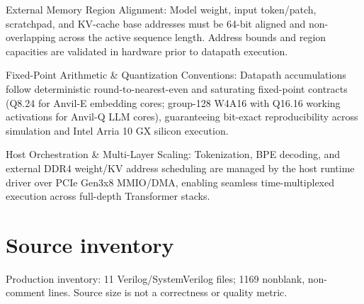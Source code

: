 \documentclass[11pt,a4paper]{article}
\begin{document}
External Memory Region Alignment: Model weight,\allowbreak{} input token/\allowbreak{}patch,\allowbreak{} scratchpad,\allowbreak{} and KV-cache base addresses must be 64-bit aligned and non-overlapping across the active sequence length. Address bounds and region capacities are validated in hardware prior to datapath execution.


Fixed-Point Arithmetic \& Quantization Conventions: Datapath accumulations follow deterministic round-to-nearest-even and saturating fixed-point contracts (\allowbreak{}Q8.24 for Anvil-E embedding cores; group-128 W4A16 with Q16.16 working activations for Anvil-Q LLM cores)\allowbreak{},\allowbreak{} guaranteeing bit-exact reproducibility across simulation and Intel Arria 10 GX silicon execution.


Host Orchestration \& Multi-Layer Scaling: Tokenization,\allowbreak{} BPE decoding,\allowbreak{} and external DDR4 weight/\allowbreak{}KV address scheduling are managed by the host runtime driver over PCIe Gen3x8 MMIO/\allowbreak{}DMA,\allowbreak{} enabling seamless time-multiplexed execution across full-depth Transformer stacks.


\appendix{}\section{Source inventory}

Production inventory: 11 Verilog/\allowbreak{}SystemVerilog files; 1169 nonblank,\allowbreak{} non-comment lines. Source size is not a correctness or quality metric.
\end{document}
